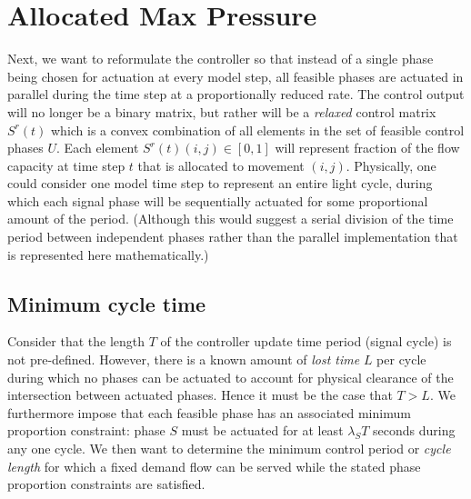 
\section{Allocated Max Pressure} \label{sec:distributed}

Next, we want to reformulate the controller so that instead of a single phase being chosen for actuation at every model step, all feasible phases are actuated in parallel during the time step at a proportionally reduced rate. The control output will no longer be a binary matrix, but rather will be a \emph{relaxed} control matrix $S^r (t)$ which is a convex combination of all elements in the set of feasible control phases $U$. Each element $S^r (t)(i,j) \in [0,1]$ will represent fraction of the flow capacity at time step $t$ that is allocated to movement $(i,j)$.  Physically, one could consider one model time step to represent an entire light cycle, during which each signal phase will be sequentially actuated for some proportional amount of the period. (Although this would suggest a serial division of the time period between independent phases rather than the parallel implementation that is represented here mathematically.)  

\subsection*{Minimum cycle time}
Consider that the length $T$ of the controller update time period (signal cycle) is not pre-defined. However, there is a known amount of \emph{lost time} $L$ per cycle during which no phases can be actuated to account for physical clearance of the intersection between actuated phases. Hence it must be the case that $T>L$.  We furthermore impose that each feasible phase has an associated minimum proportion constraint: phase $S$ must be actuated for at least $\lambda_S T$ seconds during any one cycle. We then want to determine the minimum control period or \emph{cycle length} for which a fixed demand flow can be served while the stated phase proportion constraints are satisfied. 

